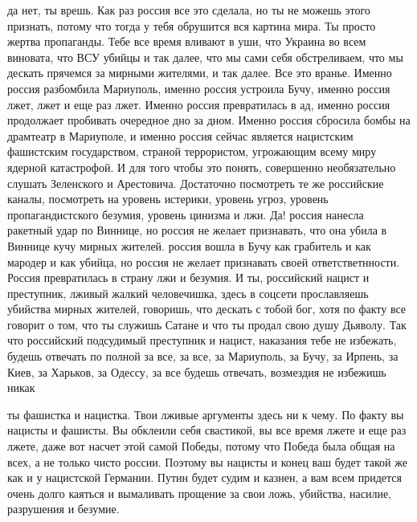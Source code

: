 да нет, ты врешь. Как раз россия все это сделала, но ты не можешь этого
признать, потому что тогда у тебя обрушится вся картина мира. Ты просто жертва
пропаганды. Тебе все время вливают в уши, что Украина во всем виновата, что ВСУ
убийцы и так далее, что мы сами себя обстреливаем, что мы дескать прячемся за
мирными жителями, и так далее. Все это вранье. Именно россия разбомбила
Мариуполь, именно россия устроила Бучу, именно россия лжет, лжет и еще раз
лжет. Именно россия превратилась в ад, именно россия продолжает пробивать
очередное дно за дном. Именно россия сбросила бомбы на драмтеатр в Мариуполе, и
именно россия сейчас является нацистским фашистским государством, страной
террористом, угрожающим всему миру ядерной катастрофой. И для того чтобы это
понять, совершенно необязательно слушать Зеленского и Арестовича. Достаточно
посмотреть те же российские каналы, посмотреть на уровень истерики, уровень
угроз, уровень пропагандистского безумия, уровень цинизма и лжи. Да! россия
нанесла ракетный удар по Виннице, но россия не желает признавать, что она убила
в Виннице кучу мирных жителей. россия вошла в Бучу как грабитель и как мародер
и как убийца, но россия не желает признавать своей ответстветнности. Россия
превратилась в страну лжи и безумия. И ты, российский нацист и преступник,
лживый жалкий человечишка, здесь в соцсети прославляешь убийства мирных
жителей, говоришь, что дескать с тобой бог, хотя по факту все говорит о том,
что ты служишь Сатане и что ты продал свою душу Дьяволу. Так что российский
подсудимый преступник и нацист, наказания тебе не избежать, будешь отвечать по
полной за все, за все, за Мариуполь, за Бучу, за Ирпень, за Киев, за Харьков,
за Одессу, за все будешь отвечать, возмездия не избежишь никак

ты фашистка и нацистка. Твои лживые аргументы здесь ни к чему. По факту вы
нацисты и фашисты. Вы обклеили себя свастикой, вы все время лжете и еще раз
лжете, даже вот насчет этой самой Победы, потому что Победа была общая на всех,
а не только чисто россии. Поэтому вы нацисты и конец ваш будет такой же как и у
нацистской Германии. Путин будет судим и казнен, а вам всем придется очень
долго каяться и вымаливать прощение за свои ложь, убийства, насилие, разрушения
и безумие.

